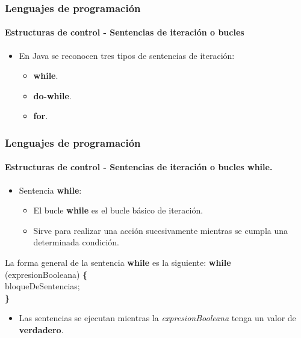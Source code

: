 \documentclass{beamer}
\begin{document}
		\begin{frame}
			\frametitle{Lenguajes de programaci\'on}
			\framesubtitle{Estructuras de control - Sentencias de iteraci\'on o bucles}

			\begin{itemize}
				\item En Java se reconocen tres tipos de sentencias de iteraci\'on:
				\begin{itemize}
					\item \textbf{while}.
					\item \textbf{do-while}.
					\item	\textbf{for}.
				\end{itemize}
			\end{itemize}
		\end{frame}

		\begin{frame}
			\frametitle{Lenguajes de programaci\'on}
			\framesubtitle{Estructuras de control - Sentencias de iteraci\'on o bucles  \textbf{while}.}

			\begin{itemize}
				\item Sentencia \textbf{while}:
				\begin{itemize}
					\item	El bucle \textbf{while} es el bucle b\'asico de iteraci\'on. 
					\item Sirve para realizar una acci\'on sucesivamente mientras se cumpla una determinada condici\'on.
				\end{itemize}
			\end{itemize}
			\begin{block}{La forma general de la sentencia \textbf{while} es la siguiente:}
			{\scriptsize
				\textbf{while} (expresionBooleana) \textbf{\{} \\
				\hspace{0.3cm} bloqueDeSentencias; \\
				\textbf{\}}
			}
			\end{block}
			\begin{itemize}
				\item Las sentencias se ejecutan mientras la {\em expresionBooleana} tenga un valor de \textbf{verdadero}.
			\end{itemize}
		\end{frame}
\end{document}
